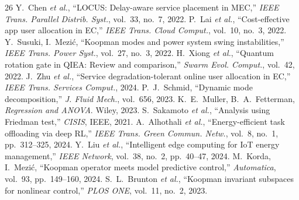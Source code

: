 \documentclass[10pt,twocolumn]{article}
\begin{document}
\begin{thebibliography}{26}
 Y.~Chen \textit{et al.}, ``LOCUS: Delay-aware service placement in MEC,'' \textit{IEEE Trans. Parallel Distrib. Syst.}, vol.~33, no.~7, 2022.
 P.~Lai \textit{et al.}, ``Cost-effective app user allocation in EC,'' \textit{IEEE Trans. Cloud Comput.}, vol.~10, no.~3, 2022.
 Y.~Susuki, I.~Mezi\'{c}, ``Koopman modes and power system swing instabilities,'' \textit{IEEE Trans. Power Syst.}, vol.~27, no.~3, 2022.
 H.~Xiong \textit{et al.}, ``Quantum rotation gate in QIEA: Review and comparison,'' \textit{Swarm Evol. Comput.}, vol.~42, 2022.
 J.~Zhu \textit{et al.}, ``Service degradation-tolerant online user allocation in EC,'' \textit{IEEE Trans. Services Comput.}, 2024.
 P.~J.~Schmid, ``Dynamic mode decomposition,'' \textit{J. Fluid Mech.}, vol.~656, 2023.
 K.~E.~Muller, B.~A.~Fetterman, \textit{Regression and ANOVA}. Wiley, 2023.
 S.~Sakamoto \textit{et al.}, ``Analysis using Friedman test,'' \textit{CISIS}, IEEE, 2021.
 A.~Alhothali \textit{et al.}, ``Energy-efficient task offloading via deep RL,'' \textit{IEEE Trans. Green Commun. Netw.}, vol.~8, no.~1, pp.~312--325, 2024.
 Y.~Liu \textit{et al.}, ``Intelligent edge computing for IoT energy management,'' \textit{IEEE Network}, vol.~38, no.~2, pp.~40--47, 2024.
 M.~Korda, I.~Mezi\'{c}, ``Koopman operator meets model predictive control,'' \textit{Automatica}, vol.~93, pp.~149--160, 2024.
 S.~L.~Brunton \textit{et al.}, ``Koopman invariant subspaces for nonlinear control,'' \textit{PLOS ONE}, vol.~11, no.~2, 2023.
\end{thebibliography}
\end{document}
